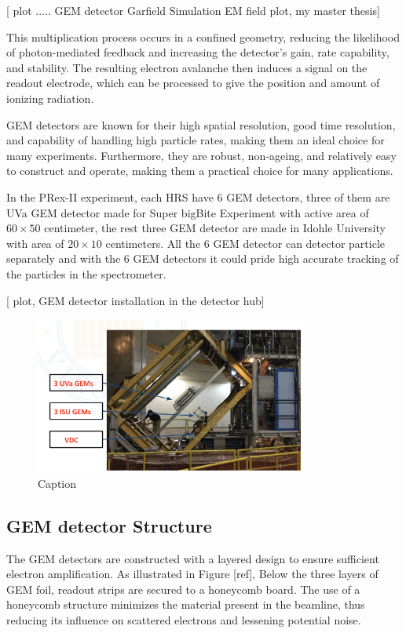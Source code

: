 [ plot ..... GEM detector Garfield Simulation EM field plot, my master thesis]

This multiplication process occurs in a confined geometry, reducing the likelihood of photon-mediated feedback and increasing the detector's gain, rate capability, and stability. The resulting electron avalanche then induces a signal on the readout electrode, which can be processed to give the position and amount of ionizing radiation.

GEM detectors are known for their high spatial resolution, good time resolution, and capability of handling high particle rates, making them an ideal choice for many experiments. Furthermore, they are robust, non-ageing, and relatively easy to construct and operate, making them a practical choice for many applications.

In the PRex-II experiment, each HRS have 6 GEM detectors, three of them are UVa GEM detector made for Super bigBite Experiment with active area of $60\times 50$ centimeter, the rest three GEM detector are made in Idohle University with area of $20 \times 10$ centimeters. All the 6 GEM detector can detector particle separately and with the 6 GEM detectors it could pride high accurate tracking of the particles in the spectrometer.  

[ plot, GEM detector installation in the detector hub]
\begin{figure}
    \centering
    \includegraphics[width=0.8\textwidth]{images/chap3/gem_in_hrs.png}
    \caption{Caption}
    \label{fig:enter-label}
\end{figure}

\subsection{GEM detector Structure}

The GEM detectors are constructed with a layered design to ensure sufficient electron amplification. As illustrated in Figure [ref], Below the three layers of GEM foil, readout strips are secured to a honeycomb board. The use of a honeycomb structure minimizes the material present in the beamline, thus reducing its influence on scattered electrons and lessening potential noise.

